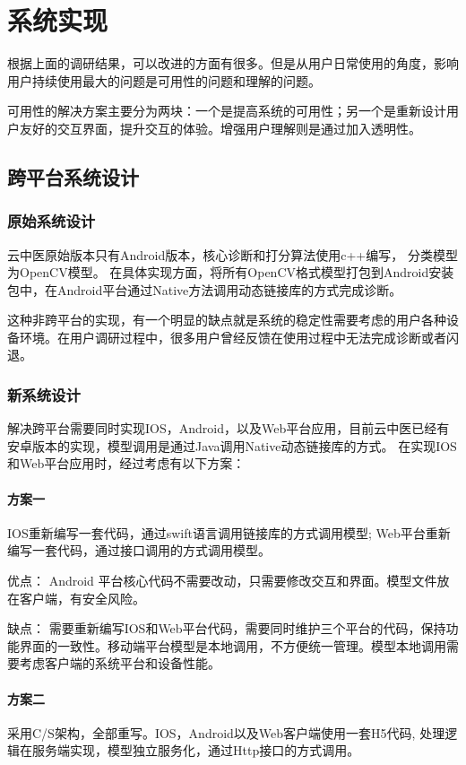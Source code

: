 \chapter{系统实现}
根据上面的调研结果，可以改进的方面有很多。但是从用户日常使用的角度，影响用户持续使用最大的问题是可用性的问题和理解的问题。

可用性的解决方案主要分为两块：一个是提高系统的可用性；另一个是重新设计用户友好的交互界面，提升交互的体验。增强用户理解则是通过加入透明性。

\section{跨平台系统设计}
\subsection{原始系统设计}
云中医原始版本只有Android版本，核心诊断和打分算法使用c++编写， 分类模型为OpenCV模型。
在具体实现方面，将所有OpenCV格式模型打包到Android安装包中，在Android平台通过Native方法调用动态链接库的方式完成诊断。

这种非跨平台的实现，有一个明显的缺点就是系统的稳定性需要考虑的用户各种设备环境。在用户调研过程中，很多用户曾经反馈在使用过程中无法完成诊断或者闪退。

\subsection{新系统设计}
解决跨平台需要同时实现IOS，Android，以及Web平台应用，目前云中医已经有安卓版本的实现，模型调用是通过Java调用Native动态链接库的方式。
在实现IOS和Web平台应用时，经过考虑有以下方案：

\subsubsection{方案一}
 IOS重新编写一套代码，通过swift语言调用链接库的方式调用模型; Web平台重新编写一套代码，通过接口调用的方式调用模型。

优点： Android 平台核心代码不需要改动，只需要修改交互和界面。模型文件放在客户端，有安全风险。

缺点： 需要重新编写IOS和Web平台代码，需要同时维护三个平台的代码，保持功能界面的一致性。移动端平台模型是本地调用，不方便统一管理。模型本地调用需要考虑客户端的系统平台和设备性能。

\subsubsection{方案二}
采用C/S架构，全部重写。IOS，Android以及Web客户端使用一套H5代码, 处理逻辑在服务端实现，模型独立服务化，通过Http接口的方式调用。


